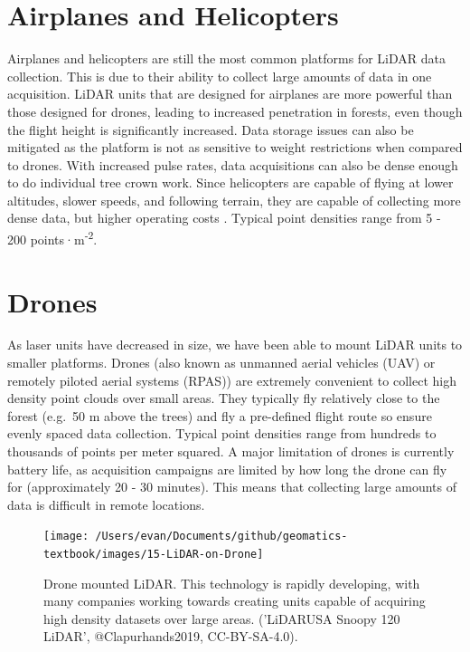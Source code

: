 \documentclass[
]{book}
\begin{document}
\hypertarget{airplanes-and-helicopters}{%
\section{Airplanes and Helicopters}\label{airplanes-and-helicopters}}

Airplanes and helicopters are still the most common platforms for LiDAR data collection. This is due to their ability to collect large amounts of data in one acquisition. LiDAR units that are designed for airplanes are more powerful than those designed for drones, leading to increased penetration in forests, even though the flight height is significantly increased. Data storage issues can also be mitigated as the platform is not as sensitive to weight restrictions when compared to drones. With increased pulse rates, data acquisitions can also be dense enough to do individual tree crown work. Since helicopters are capable of flying at lower altitudes, slower speeds, and following terrain, they are capable of collecting more dense data, but higher operating costs \citep{White2013}. Typical point densities range from 5 - 200 points·m\textsuperscript{-2}.

\hypertarget{drones}{%
\section{Drones}\label{drones}}

As laser units have decreased in size, we have been able to mount LiDAR units to smaller platforms. Drones (also known as unmanned aerial vehicles (UAV) or remotely piloted aerial systems (RPAS)) are extremely convenient to collect high density point clouds over small areas. They typically fly relatively close to the forest (e.g.~50 m above the trees) and fly a pre-defined flight route so ensure evenly spaced data collection. Typical point densities range from hundreds to thousands of points per meter squared. A major limitation of drones is currently battery life, as acquisition campaigns are limited by how long the drone can fly for (approximately 20 - 30 minutes). This means that collecting large amounts of data is difficult in remote locations.

\begin{figure}
\texttt{[image: /Users/evan/Documents/github/geomatics-textbook/images/15-LiDAR-on-Drone]} \caption{Drone mounted LiDAR. This technology is rapidly developing, with many companies working towards creating units capable of acquiring high density datasets over large areas. ('LiDARUSA Snoopy 120 LiDAR', @Clapurhands2019,  CC-BY-SA-4.0).}\label{fig:15-LiDAR-on-Drone}
\end{figure}
\end{document}
